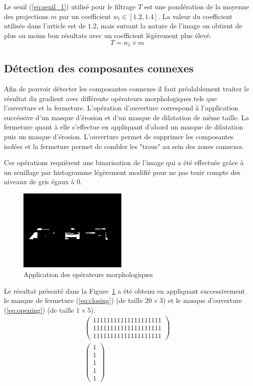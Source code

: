 \documentclass[a4paper,10pt,twocolumn]{article}
\begin{document}
Le seuil (\ref{eq:seuil_1}) utilisé pour le filtrage $T$ est une pondération de la moyenne des projections $m$ par un coefficient $w_t \in [1.2, 1.4]$. La valeur du coefficient utilisée dans l'article est de $1.2$, mais suivant la nature de l'image on obtient de plus ou moins bon résultats avec un coefficient légèrement plus élevé.
\begin{equation} \label{eq:seuil_1} 
  T = w_t \times m
\end{equation}

\subsection{Détection des composantes connexes}
Afin de pouvoir détecter les composantes connexes il faut préalablement traiter le résultat du gradient avec différente opérateurs morphologiques tels que l'ouverture et la fermeture. L'opération d'ouverture correspond à l'application succéssive d'un masque d'érosion et d'un masque de dilatation de même taille. La fermeture quant à elle s'effectue en appliquant d'abord un masque de dilatation puis un masque d'érosion. L'ouverture permet de supprimer les composantes isolées et la fermeture permet de combler les "trous" au sein des zones connexes.

Ces opérations requièrent une binarisation de l'image qui a été effectuée grâce à un seuillage par histogramme légèrement modifié pour ne pas tenir compte des niveaux de gris égaux à 0.
\begin{figure}[H]
	\centering 
	  \includegraphics[width=200px]{img/991213-006_morpho.png}
	\caption{Application des opérateurs morphologiques\label{morpho}}
\end{figure}
Le résultat présenté dans la Figure~\ref{morpho} a été obtenu en appliquant successivement le masque de fermeture (\ref{eq:closing}) (de taille $20 \times 3$) et le masque d'ouverture (\ref{eq:opening}) (de taille $1 \times 5$).
\begin{gather}
  \label{eq:closing}
  \left( \begin{array}{c} 
    1 1 1 1 1 1 1 1 1 1 1 1 1 1 1 1 1 1 1 1\\
    1 1 1 1 1 1 1 1 1 1 1 1 1 1 1 1 1 1 1 1\\
    1 1 1 1 1 1 1 1 1 1 1 1 1 1 1 1 1 1 1 1    
  \end{array} \right)\\
  \label{eq:opening}
  \left( \begin{array}{c} 
    1\\
    1\\
    1\\
    1\\
    1   
  \end{array} \right)
\end{gather}
\end{document}
